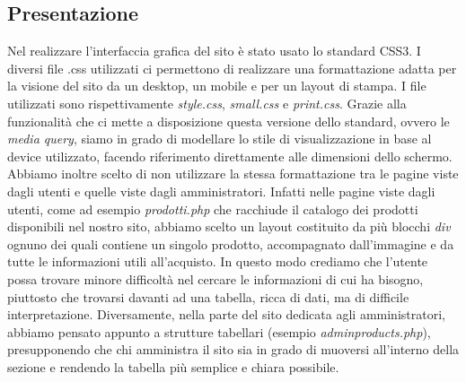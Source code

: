 \subsection{Presentazione}

Nel realizzare l'interfaccia grafica del sito è stato usato lo standard CSS3.\newline
I diversi file .css utilizzati ci permettono di realizzare una formattazione adatta per la visione del sito da un desktop, un mobile e per un layout di stampa.\newline
I file utilizzati sono rispettivamente \textit{style.css}, \textit{small.css} e \textit{print.css}.\newline
Grazie alla funzionalità che ci mette a disposizione questa versione dello standard, ovvero le \textit{media query}, siamo in grado di modellare lo stile di visualizzazione in base al device utilizzato, facendo riferimento direttamente alle dimensioni dello schermo.\newline
\newline
Abbiamo inoltre scelto di non utilizzare la stessa formattazione tra le pagine viste dagli utenti e quelle viste dagli amministratori. Infatti nelle pagine viste dagli utenti, come ad esempio \textit{prodotti.php} che racchiude il catalogo dei prodotti disponibili nel nostro sito, abbiamo scelto un layout costituito da più blocchi \textit{div} ognuno dei quali contiene un singolo prodotto, accompagnato dall'immagine e da tutte le informazioni utili all'acquisto.\newline
In questo modo crediamo che l'utente possa trovare minore difficoltà nel cercare le informazioni di cui ha bisogno, piuttosto che trovarsi davanti ad una tabella, ricca di dati, ma di difficile interpretazione.\newline
Diversamente, nella parte del sito dedicata agli amministratori, abbiamo pensato appunto a strutture tabellari (esempio \textit{adminproducts.php}), presupponendo che chi amministra il sito sia in grado di muoversi all'interno della sezione e rendendo la tabella più semplice e chiara possibile.